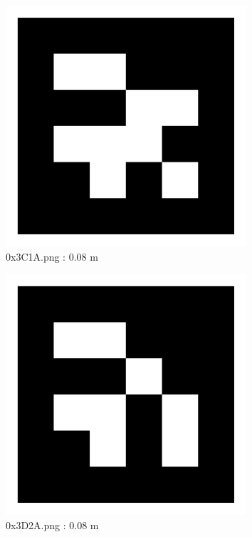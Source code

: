 \documentclass[11pt,a4,BCOR=0cm]{scrartcl}
\begin{document}
\begin{figure}
  \centering
    \includegraphics[width=8.955cm]{0x3C1A.pdf}
    \caption{0x3C1A.png : 0.08 m}
    \label{fig:0x3C1A.pdf}
  
\end{figure} 

\begin{figure}
  \centering
    \includegraphics[width=8.955cm]{0x3D2A.pdf}
    \caption{0x3D2A.png : 0.08 m}
    \label{fig:0x3D2A.pdf}
  
\end{figure} 

\clearpage
\end{document}
